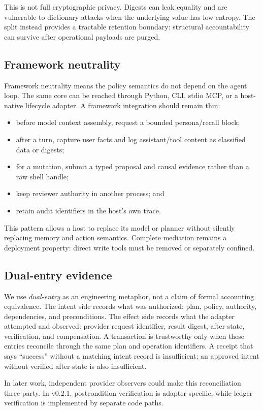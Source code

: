 This is not full cryptographic privacy. Digests can leak equality and are vulnerable to dictionary attacks when the underlying value has low entropy. The split instead provides a tractable retention boundary: structural accountability can survive after operational payloads are purged.

\subsection{Framework neutrality}

Framework neutrality means the policy semantics do not depend on the agent loop. The same core can be reached through Python, CLI, stdio MCP, or a host-native lifecycle adapter. A framework integration should remain thin:

\begin{itemize}
  \item before model context assembly, request a bounded persona/recall block;
  \item after a turn, capture user facts and log assistant/tool content as classified data or digests;
  \item for a mutation, submit a typed proposal and causal evidence rather than a raw shell handle;
  \item keep reviewer authority in another process; and
  \item retain audit identifiers in the host's own trace.
\end{itemize}

This pattern allows a host to replace its model or planner without silently replacing memory and action semantics. Complete mediation remains a deployment property: direct write tools must be removed or separately confined.

\subsection{Dual-entry evidence}

We use \emph{dual-entry} as an engineering metaphor, not a claim of formal accounting equivalence. The intent side records what was authorized: plan, policy, authority, dependencies, and preconditions. The effect side records what the adapter attempted and observed: provider request identifier, result digest, after-state, verification, and compensation. A transaction is trustworthy only when these entries reconcile through the same plan and operation identifiers. A receipt that says ``success'' without a matching intent record is insufficient; an approved intent without verified after-state is also insufficient.

In later work, independent provider observers could make this reconciliation three-party. In v0.2.1, postcondition verification is adapter-specific, while ledger verification is implemented by separate code paths.
